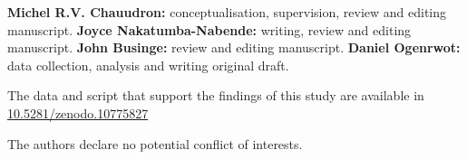 \documentclass[AMA,Times1COL]{WileyNJDv5} %
\begin{document}
{}

\textbf{Michel R.V. Chauudron:} conceptualisation, supervision, review and editing manuscript. \textbf{Joyce Nakatumba-Nabende:} writing, review and editing manuscript.  \textbf{John Businge:} review and editing manuscript. \textbf{Daniel Ogenrwot:} data collection, analysis and writing original draft.

The data and script that support the findings of this study are available in \href{https://doi.org/10.5281/zenodo.10775827}{10.5281/zenodo.10775827}


The authors declare no potential conflict of interests.








\appendix
\end{document}
